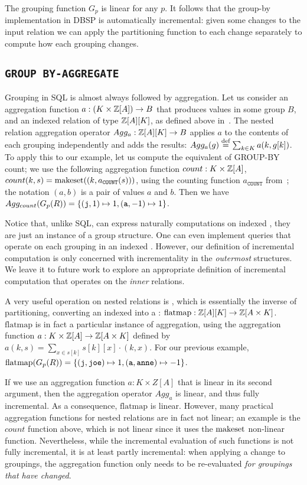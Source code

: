 The grouping function $G_p$ is linear for any $p$.
It follows that the group-by implementation in DBSP is automatically
incremental: given some changes
to the input relation we can apply the partitioning function
to each change separately to compute how each grouping changes.

\subsection{\texttt{GROUP BY-AGGREGATE}}

Grouping in SQL is almost always followed by aggregation.  
Let us consider an aggregation function $a: (K \times \mathbb{Z}[A]) \to B$ that produces values
in some group $B$, and an indexed relation of type $\mathbb{Z}[A][K]$, as defined above in~.
The nested relation aggregation operator $Agg_a: \mathbb{Z}[A][K] \to B$ applies $a$ 
to the contents of each grouping independently and adds the results:
$Agg_a(g) \stackrel{\textrm{\scriptsize def}}{=} \sum_{k \in K} a(k, g[k])$.  To apply this
to our example, let us compute the equivalent of GROUP-BY count; we use
the following aggregation function $count: K \times \mathbb{Z}[A]$, $count(k, s) = 
\mbox{makeset}((k, a_\texttt{COUNT}(s)))$, using the \zr counting function $a_\texttt{COUNT}$ 
from~; the notation $(a,b)$ is a pair of values $a$ and $b$.
Then we have $Agg_{count} (G_p(R)) = \{ (\mbox{\texttt{j}}, 1) \mapsto 1, 
(\mbox{\texttt{a}}, -1) \mapsto 1 \}$.

Notice that, unlike SQL, \dbsp can express naturally computations
on indexed \zrs, they are just an instance of a group structure. 
One can even implement queries that operate on each grouping 
in an indexed \zr.  However, our definition of incremental 
computation is only concerned with incrementality in the 
\emph{outermost} structures.  We leave it to future work to
explore an appropriate definition of incremental computation that
operates on the \emph{inner} relations.

A very useful operation on nested relations is , which is
essentially the inverse of partitioning, converting an indexed
\zr into a \zr: $\mbox{flatmap}: \mathbb{Z}[A][K] \to \mathbb{Z}[A \times K]$.
$\mbox{flatmap}$ is in fact a particular instance of aggregation,
using the aggregation function $a: K \times \mathbb{Z}[A] \to \mathbb{Z}[A \times K]$
defined by $a(k, s) = \sum_{x \in s[k]} s[k][x] \cdot (k, x).$
For our previous example, $\mbox{flatmap}(G_p(R)) = \{ (\mbox{\texttt{j}}, \mbox{\texttt{joe}}) \mapsto 1, 
(\mbox{\texttt{a}}, \mbox{\texttt{anne}}) \mapsto -1 \}$.

If we use an aggregation function $a: K \times Z[A]$ that is linear in its
second argument, then the aggregation operator $Agg_a$ is linear, and
thus fully incremental.  As a consequence, $\mbox{flatmap}$ is linear.  
However, many practical aggregation functions for nested relations are in fact 
not linear; an example is the $count$ function above, which is not linear
since it uses the $\mbox{makeset}$ non-linear function.  Nevertheless, while 
the incremental evaluation of such functions is not fully incremental, 
it is at least partly incremental: when applying a change to groupings, the aggregation 
function only needs to be re-evaluated \emph{for groupings that have changed}.



